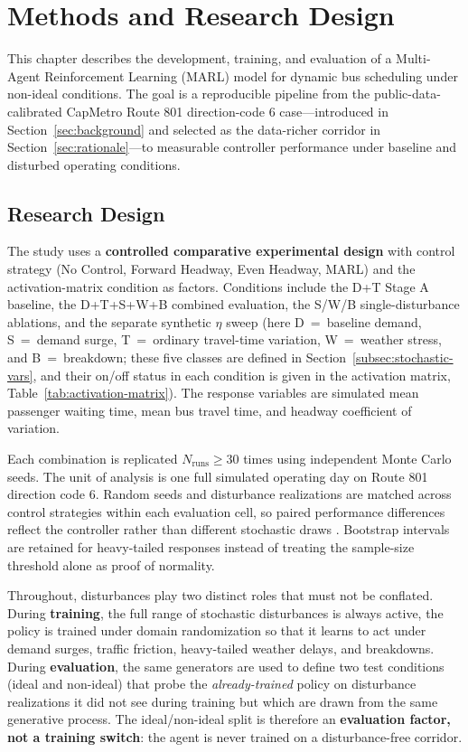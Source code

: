 \chapter{Methods and Research Design}

This chapter describes the development, training, and evaluation of a Multi-Agent Reinforcement Learning (MARL) model for dynamic bus scheduling under non-ideal conditions. The goal is a reproducible pipeline from the public-data-calibrated CapMetro Route 801 direction-code 6 case---introduced in Section~\ref{sec:background} and selected as the data-richer corridor in Section~\ref{sec:rationale}---to measurable controller performance under baseline and disturbed operating conditions.


\section{Research Design}\label{sec:research-design}

The study uses a \textbf{controlled comparative experimental design} with control strategy (No Control, Forward Headway, Even Headway, MARL) and the activation-matrix condition as factors. Conditions include the D+T Stage A baseline, the D+T+S+W+B combined evaluation, the S/W/B single-disturbance ablations, and the separate synthetic $\eta$ sweep (here D~=~baseline demand, S~=~demand surge, T~=~ordinary travel-time variation, W~=~weather stress, and B~=~breakdown; these five classes are defined in Section~\ref{subsec:stochastic-vars}, and their on/off status in each condition is given in the activation matrix, Table~\ref{tab:activation-matrix}). The response variables are simulated mean passenger waiting time, mean bus travel time, and headway coefficient of variation.

Each combination is replicated $N_{\mathrm{runs}} \geq 30$ times using independent Monte Carlo seeds. The unit of analysis is one full simulated operating day on Route 801 direction code 6. Random seeds and disturbance realizations are matched across control strategies within each evaluation cell, so paired performance differences reflect the controller rather than different stochastic draws \cite{Henderson2018Matters,Agarwal2021Precipice}. Bootstrap intervals are retained for heavy-tailed responses instead of treating the sample-size threshold alone as proof of normality.

Throughout, disturbances play two distinct roles that must not be conflated. During \textbf{training}, the full range of stochastic disturbances is always active, the policy is trained under domain randomization \cite{Tang2024Curriculum} so that it learns to act under demand surges, traffic friction, heavy-tailed weather delays, and breakdowns. During \textbf{evaluation}, the same generators are used to define two test conditions (ideal and non-ideal) that probe the \textit{already-trained} policy on disturbance realizations it did not see during training but which are drawn from the same generative process. The ideal/non-ideal split is therefore an \textbf{evaluation factor, not a training switch}: the agent is never trained on a disturbance-free corridor. 

